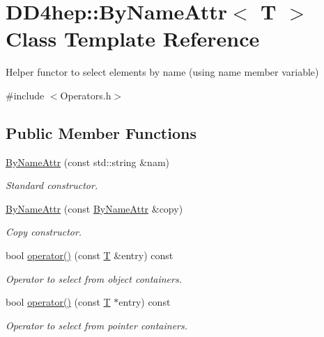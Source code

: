 \hypertarget{class_d_d4hep_1_1_by_name_attr}{}\section{D\+D4hep\+:\+:By\+Name\+Attr$<$ T $>$ Class Template Reference}
\label{class_d_d4hep_1_1_by_name_attr}


Helper functor to select elements by name (using name member variable)  




{\ttfamily \#include $<$Operators.\+h$>$}

\subsection*{Public Member Functions}
\begin{DoxyCompactItemize}
\item 
\hyperlink{class_d_d4hep_1_1_by_name_attr_a69abb8e2cf258848ca9b19ef02082fde}{By\+Name\+Attr} (const std\+::string \&nam)
\begin{DoxyCompactList}\small\item\em Standard constructor. \end{DoxyCompactList}\item 
\hyperlink{class_d_d4hep_1_1_by_name_attr_a782ea1d32c95453edfa5da378770d03a}{By\+Name\+Attr} (const \hyperlink{class_d_d4hep_1_1_by_name_attr}{By\+Name\+Attr} \&copy)
\begin{DoxyCompactList}\small\item\em Copy constructor. \end{DoxyCompactList}\item 
bool \hyperlink{class_d_d4hep_1_1_by_name_attr_ade50268ee6445ddf933edd4f1c43b899}{operator()} (const \hyperlink{class_t}{T} \&entry) const
\begin{DoxyCompactList}\small\item\em Operator to select from object containers. \end{DoxyCompactList}\item 
bool \hyperlink{class_d_d4hep_1_1_by_name_attr_a00059495a4ebf7f700a88d8249577cb0}{operator()} (const \hyperlink{class_t}{T} $\ast$entry) const
\begin{DoxyCompactList}\small\item\em Operator to select from pointer containers. \end{DoxyCompactList}\end{DoxyCompactItemize}
